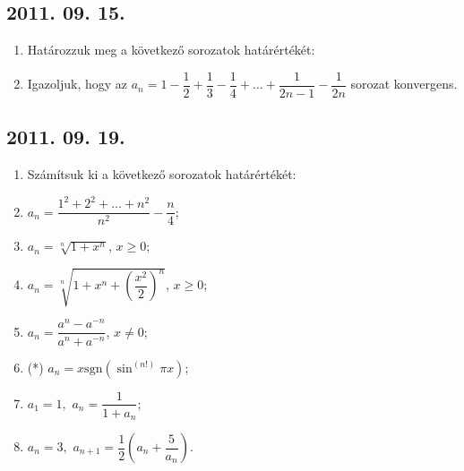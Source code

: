\subsection*{2011. 09. 15.}
\begin{enumerate}
\item Határozzuk meg a következő sorozatok határértékét:
\item Igazoljuk, hogy az $a_n=1-\dfrac{1}{2}+\dfrac{1}{3}-\dfrac{1}{4}+\ldots+\dfrac{1}{2n-1}-\dfrac{1}{2n}$ sorozat konvergens.
\end{enumerate}


\subsection*{2011. 09. 19.}
\begin{enumerate}
\item Számítsuk ki a következő sorozatok határértékét:
	\item $a_n=\dfrac{1^2+2^2+\ldots+n^2}{n^2}-\dfrac{n}{4}$;     
    \item $a_n=\sqrt[n]{1+x^n}$, $x\ge0$;
    \item $a_n=\sqrt[n]{1+x^n+\left(\dfrac{x^2}{2}\right)^n}$, $x\ge0$;
    \item $a_n=\dfrac{a^n-a^{-n}}{a^n+a^{-n}}$, $x\not=0$;
    \item (*) $a_n=x\mathrm{sgn}(\sin^(n!)\pi x)$;   
    \item $a_1=1,$ $a_n=\dfrac{1}{1+a_n}$;
    \item $a_n=3,$ $a_{n+1}=\dfrac{1}{2}\left(a_n+\dfrac{5}{a_n}\right)$.
\end{enumerate}


